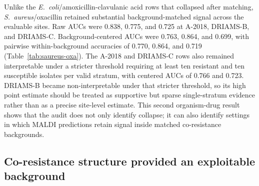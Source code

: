\documentclass[11pt]{article}
\begin{document}
Unlike the \textit{E.~coli}/amoxicillin-clavulanic acid rows that collapsed after matching, \textit{S.~aureus}/oxacillin retained substantial background-matched signal across the evaluable sites. Raw AUCs were 0.838, 0.775, and 0.725 at A-2018, DRIAMS-B, and DRIAMS-C. Background-centered AUCs were 0.763, 0.864, and 0.699, with pairwise within-background accuracies of 0.770, 0.864, and 0.719 (Table~\ref{tab:saureus-oxa}). The A-2018 and DRIAMS-C rows also remained interpretable under a stricter threshold requiring at least ten resistant and ten susceptible isolates per valid stratum, with centered AUCs of 0.766 and 0.723. DRIAMS-B became non-interpretable under that stricter threshold, so its high point estimate should be treated as supportive but sparse single-stratum evidence rather than as a precise site-level estimate. This second organism-drug result shows that the audit does not only identify collapse; it can also identify settings in which MALDI predictions retain signal inside matched co-resistance backgrounds.

\begin{table}[ht]
\centering
\small
\caption{\textbf{\textit{S.~aureus}/oxacillin background-matched audit.} Oxacillin retained background-matched signal at the three evaluable DRIAMS sites. DRIAMS-D was not included because the exported panel contained no usable oxacillin focal rows.}
\label{tab:saureus-oxa}
\end{table}

\subsection*{Co-resistance structure provided an exploitable background}
\end{document}
